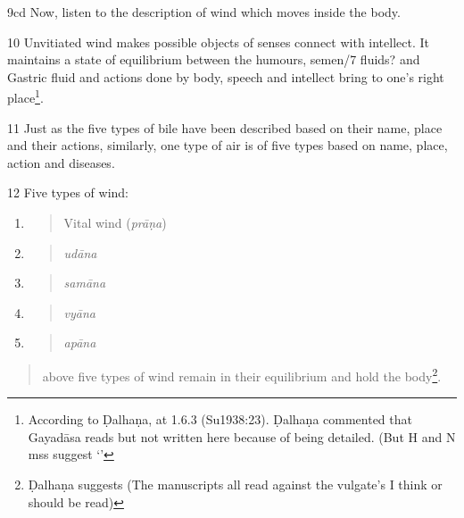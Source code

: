 \begin{translation}
\item[9cd] Now, listen to the description of wind which moves inside the
body.
                    
\item[10] Unvitiated wind makes possible objects of senses connect with
intellect. It maintains a state of equilibrium between the humours,
semen/7 fluids? and Gastric fluid and actions done by body, speech and
intellect bring to one's right place\footnote{ According to Ḍalhaṇa,
    at 1.6.3 (Su1938:23). Ḍalhaṇa commented that
    Gayadāsa reads but not written here
    because of being detailed. (But H and N mss suggest `'}.

\item[11] Just as the five types of bile have been described based 
on their
name, place and their actions, similarly, one type of air is of five
types based on name, place, action and diseases.

\item[12] Five types of wind:

\begin{enumerate}
    \def\labelenumi{\arabic{enumi}.}
    \item
    \begin{quote}
        Vital wind (\emph{prāṇa})
    \end{quote}
    \item
    \begin{quote}
        \emph{udāna }
    \end{quote}
    \item
    \begin{quote}
        \emph{samāna}
    \end{quote}
    \item
    \begin{quote}
        \emph{vyāna}
    \end{quote}
    \item
    \begin{quote}
        \emph{apāna}
    \end{quote}
\end{enumerate}

\begin{quote}
    above five types of wind remain in their equilibrium and hold the
body\footnote{ Ḍalhaṇa suggests 
    (The manuscripts all read        against the vulgate's  I think  or  should be read)}.
    \end{quote}
    

\end{translation}

